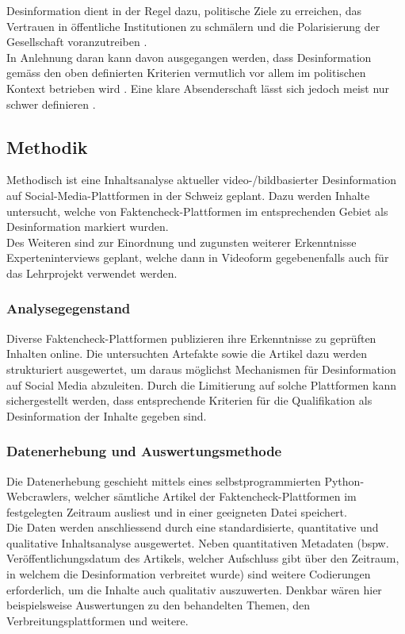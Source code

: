 \documentclass[12pt,a4paper]{article}        %
\begin{document}
Desinformation dient in der Regel dazu, politische Ziele zu erreichen, das Vertrauen in öffentliche Institutionen zu schmälern und die Polarisierung der Gesellschaft voranzutreiben \parencites[vgl.][ ]{allcott_social_2017}[225]{schmidt_meinungsbildung_2022}[162]{lange_unsicherheit_2019}. \\

In Anlehnung daran kann davon ausgegangen werden, dass Desinformation gemäss den oben definierten Kriterien vermutlich vor allem im politischen Kontext betrieben wird \parencites[vgl.][51]{sammer_fake_2021}[217]{allcott_social_2017}[498]{behnke_manipulation_2018}. Eine klare Absenderschaft lässt sich jedoch meist nur schwer definieren \parencite[498-499]{behnke_manipulation_2018}.

\subsection{Methodik}
Methodisch ist eine Inhaltsanalyse aktueller video-/bildbasierter Desinformation auf Social-Media-Plattformen in der Schweiz geplant. Dazu werden Inhalte untersucht, welche von Faktencheck-Plattformen im entsprechenden Gebiet als Desinformation markiert wurden. \\
Des Weiteren sind zur Einordnung und zugunsten weiterer Erkenntnisse Experteninterviews geplant, welche dann in Videoform gegebenenfalls auch für das Lehrprojekt verwendet werden.

\subsubsection{Analysegegenstand}
Diverse Faktencheck-Plattformen publizieren ihre Erkenntnisse zu geprüften Inhalten online. Die untersuchten Artefakte sowie die Artikel dazu werden strukturiert ausgewertet, um daraus möglichst Mechanismen für Desinformation auf Social Media abzuleiten. Durch die Limitierung auf solche Plattformen kann sichergestellt werden, dass entsprechende Kriterien für die Qualifikation als Desinformation der Inhalte gegeben sind.

\subsubsection{Datenerhebung und Auswertungsmethode}
Die Datenerhebung geschieht mittels eines selbstprogrammierten Python-Webcrawlers, welcher sämtliche Artikel der Faktencheck-Plattformen im festgelegten Zeitraum ausliest und in einer geeigneten Datei speichert. \\
Die Daten werden anschliessend durch eine standardisierte, quantitative und qualitative Inhaltsanalyse ausgewertet. Neben quantitativen Metadaten (bspw. Veröffentlichungsdatum des Artikels, welcher Aufschluss gibt über den Zeitraum, in welchem die Desinformation verbreitet wurde) sind weitere Codierungen erforderlich, um die Inhalte auch qualitativ auszuwerten. Denkbar wären hier beispielsweise Auswertungen zu den behandelten Themen, den Verbreitungsplattformen und weitere.
\end{document}
